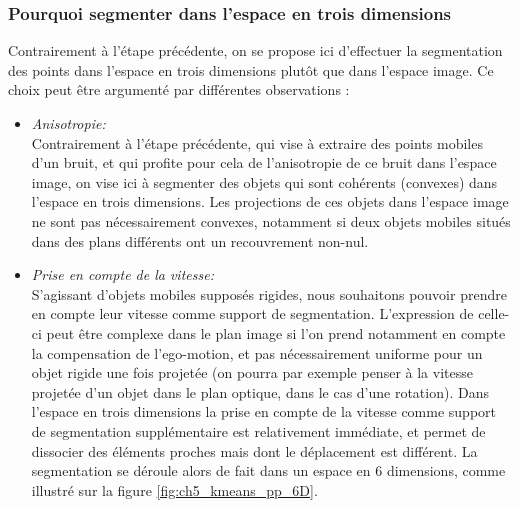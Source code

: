 \subsubsection{Pourquoi segmenter dans l'espace en trois dimensions}
Contrairement à l'étape précédente, on se propose ici d'effectuer la segmentation des points dans l'espace en trois dimensions plutôt que dans l'espace image. Ce choix peut être argumenté par différentes observations :
\begin{itemize}
	\item{\emph{Anisotropie:\\}}
	Contrairement à l'étape précédente, qui vise à extraire des points mobiles d'un bruit, et qui profite pour cela de l'anisotropie de ce bruit dans l'espace image, on vise ici à segmenter des objets qui sont cohérents (convexes) dans l'espace en trois dimensions. Les projections de ces objets dans l'espace image ne sont pas nécessairement convexes, notamment si deux objets mobiles situés dans des plans différents ont un recouvrement non-nul.\\
	
	\item{\emph{Prise en compte de la vitesse:\\}}
	S'agissant d'objets mobiles supposés rigides, nous souhaitons pouvoir prendre en compte leur vitesse comme support de segmentation. L'expression de celle-ci peut être complexe dans le plan image si l'on prend notamment en compte la compensation de l'ego-motion, et pas nécessairement uniforme pour un objet rigide une fois projetée (on pourra par exemple penser à la vitesse projetée d'un objet dans le plan optique, dans le cas d'une rotation). Dans l'espace en trois dimensions la prise en compte de la vitesse comme support de segmentation supplémentaire est relativement immédiate, et permet de dissocier des éléments proches mais dont le déplacement est différent. La segmentation se déroule alors de fait dans un espace en 6 dimensions, comme illustré sur la figure \ref{fig:ch5_kmeans_pp_6D}.
\end{itemize}

